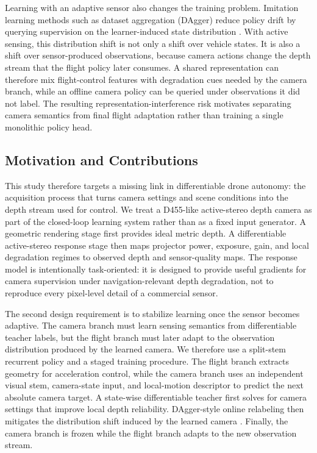\documentclass[letterpaper,journal]{IEEEtran}
\begin{document}
Learning with an adaptive sensor also changes the training problem. Imitation
learning methods such as dataset aggregation (DAgger) reduce policy drift by
querying supervision on the learner-induced state distribution
\cite{ross2011dagger}. With active sensing, this distribution shift is not only
a shift over vehicle states. It is also a shift over sensor-produced
observations, because camera actions change the depth stream that the flight
policy later consumes. A shared representation can therefore mix flight-control
features with degradation cues needed by the camera branch, while an offline
camera policy can be queried under observations it did not label. The resulting
representation-interference risk motivates separating camera semantics from
final flight adaptation rather than training a single monolithic policy head.

\subsection*{Motivation and Contributions}
This study therefore targets a missing link in differentiable drone autonomy:
the acquisition process that turns camera settings and scene conditions into
the depth stream used for control. We treat a D455-like active-stereo depth
camera as part of the closed-loop learning system rather than as a fixed input
generator. A geometric rendering stage first provides ideal metric depth. A
differentiable active-stereo response stage then maps projector power, exposure,
gain, and local degradation regimes to observed depth and sensor-quality maps.
The response model is intentionally task-oriented: it is designed to provide
useful gradients for camera supervision under navigation-relevant depth
degradation, not to reproduce every pixel-level detail of a commercial sensor.

The second design requirement is to stabilize learning once the sensor becomes
adaptive. The camera branch must learn sensing semantics from differentiable
teacher labels, but the flight branch must later adapt to the observation
distribution produced by the learned camera. We therefore use a split-stem
recurrent policy and a staged training procedure. The flight branch extracts
geometry for acceleration control, while the camera branch uses an independent
visual stem, camera-state input, and local-motion descriptor to predict the
next absolute camera target. A state-wise differentiable teacher first solves
for camera settings that improve local depth reliability. DAgger-style online
relabeling then mitigates the distribution shift induced by the learned camera
\cite{ross2011dagger}. Finally, the camera branch is frozen while the flight
branch adapts to the new observation stream.
\end{document}
